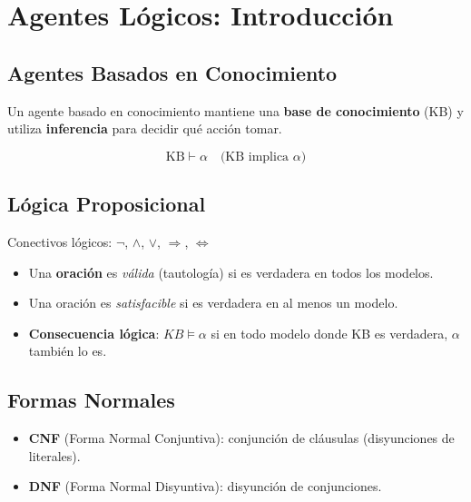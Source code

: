 \section{Agentes Lógicos: Introducción}

\subsection{Agentes Basados en Conocimiento}

Un agente basado en conocimiento mantiene una \textbf{base de conocimiento} (KB) y utiliza \textbf{inferencia} para decidir qué acción tomar.

$$\text{KB} \vdash \alpha \quad \text{(KB implica } \alpha\text{)}$$

\subsection{Lógica Proposicional}

Conectivos lógicos: $\neg$, $\land$, $\lor$, $\Rightarrow$, $\Leftrightarrow$

\begin{itemize}
    \item Una \textbf{oración} es \textit{válida} (tautología) si es verdadera en todos los modelos.
    \item Una oración es \textit{satisfacible} si es verdadera en al menos un modelo.
    \item \textbf{Consecuencia lógica}: $KB \models \alpha$ si en todo modelo donde KB es verdadera, $\alpha$ también lo es.
\end{itemize}

\subsection{Formas Normales}

\begin{itemize}
    \item \textbf{CNF} (Forma Normal Conjuntiva): conjunción de cláusulas (disyunciones de literales).
    \item \textbf{DNF} (Forma Normal Disyuntiva): disyunción de conjunciones.
\end{itemize}

